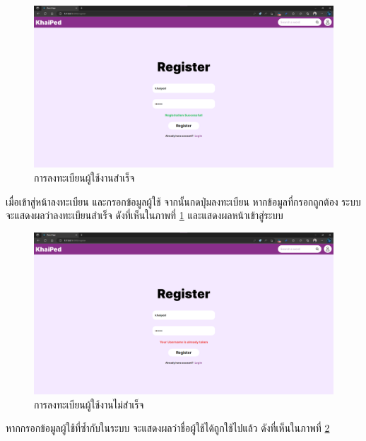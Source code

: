 \documentclass[12pt,oneside,openright,a4paper]{cpe-thai-project}
\begin{document}
\pagebreak
\begin{figure}[!h]\centering
	\includegraphics[width=\textwidth, keepaspectratio=true]{image/chap4/UI/register success.png}
	\caption{{การลงทะเบียนผู้ใช้งานสำเร็จ}}\label{fig:chap4UIRegisterSuccess}
\end{figure}
\hspace{1cm}
เมื่อเข้าสู่หน้าลงทะเบียน และกรอกข้อมูลผู้ใช้ จากนั้นกดปุ่มลงทะเบียน หากข้อมูลที่กรอกถูกต้อง ระบบจะแสดงผลว่าลงทะเบียนสำเร็จ 
ดังที่เห็นในภาพที่ \ref{fig:chap4UIRegisterSuccess} และแสดงผลหน้าเข้าสู่ระบบ

\begin{figure}[!h]\centering
	\includegraphics[width=\textwidth, keepaspectratio=true]{image/chap4/UI/register failed.png}
	\caption{{การลงทะเบียนผู้ใช้งานไม่สำเร็จ}}\label{fig:chap4UIRegisterFailed}
\end{figure}
\hspace{1cm}
หากกรอกข้อมูลผู้ใช้ที่ซ้ำกับในระบบ จะแสดงผลว่าชื่อผู้ใช้ได้ถูกใช้ไปแล้ว ดังที่เห็นในภาพที่ \ref{fig:chap4UIRegisterFailed}
\end{document}
